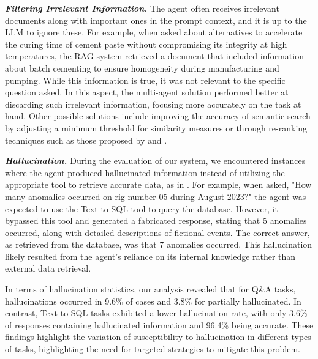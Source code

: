                 \textbf{\textit{Filtering Irrelevant Information.}} 
                    The agent often receives irrelevant documents along with important ones in the prompt context, and it is up to the LLM to ignore these. 
                    For example, when asked about alternatives to accelerate the curing time of cement paste without compromising its integrity at high temperatures, the RAG system retrieved a document that included information about batch cementing to ensure homogeneity during manufacturing and pumping. 
                    While this information is true, it was not relevant to the specific question asked. 
                    In this aspect, the multi-agent solution performed better at discarding such irrelevant information, focusing more accurately on the task at hand. 
                    Other possible solutions include improving the accuracy of semantic search by adjusting a minimum threshold for similarity measures or through re-ranking techniques such as those proposed by \citep{Carraro2024} and \citep{Sun2023}.
                
                \textbf{\textit{Hallucination.}} 
                    During the evaluation of our system, we encountered instances where the agent produced hallucinated information instead of utilizing the appropriate tool to retrieve accurate data, as in \citep{Bilbao2023}. 
                    For example, when asked, "How many anomalies occurred on rig number 05 during August 2023?" the agent was expected to use the Text-to-SQL tool to query the database. 
                    However, it bypassed this tool and generated a fabricated response, stating that 5 anomalies occurred, along with detailed descriptions of fictional events. The correct answer, as retrieved from the database, was that 7 anomalies occurred. This hallucination likely resulted from the agent's reliance on its internal knowledge rather than external data retrieval. 

                    In terms of hallucination statistics, our analysis revealed that for Q\&A tasks, hallucinations occurred in 9.6\% of cases and 3.8\% for partially hallucinated. 
                    In contrast, Text-to-SQL tasks exhibited a lower hallucination rate, with only 3.6\% of responses containing hallucinated information and 96.4\% being accurate. 
                    These findings highlight the variation of susceptibility to hallucination in different types of tasks, highlighting the need for targeted strategies to mitigate this problem.
                
